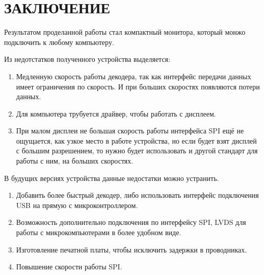 \chapter*{ЗАКЛЮЧЕНИЕ}

	Результатом проделанной работы стал компактный монитора, который монжо подключить к любому компьютеру. 
	
	Из недотстатков полученного устройства выделяется:
	
	\begin{enumerate}
		\item Медленную скорость работы декодера, так как интерфейс передачи данных имеет ограничения по скорость. И при больших скоростях появляются потери данных.
		\item Для компьютера трубуется драйвер, чтобы работать с дисплеем.
		\item При малом дисплеи не большая скорость работы интерфейса SPI ещё не ощущается, как узкое место в работе устройства, но если будет взят дисплей с большим разрешением, то нужно будет использовать и другой стандарт для работы с ним, на больших скоростях.
	\end{enumerate}

	В будущих версиях устройства данные недостатки можно устранить.
	
	\begin{enumerate}
		\item Добавить более быстрый декодер, либо использовать интерфейс подключения USB на прямую с микроконтроллером.
		\item Возможность дополнительно подключения по интерфейсу SPI, LVDS для работы с микрокомпьютерами в более удобном виде.
		\item Изготовление печатной платы, чтобы исключить задержки в проводниках.
		\item Повышение скорости работы SPI.
	\end{enumerate}
